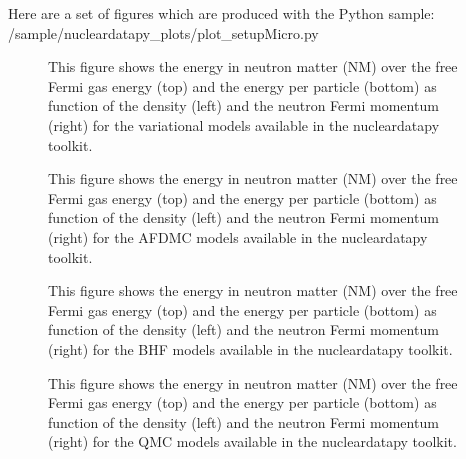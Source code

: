 \documentclass[letterpaper,10pt,english]{sphinxmanual}
\begin{document}
\sphinxAtStartPar
Here are a set of figures which are produced with the Python sample: /sample/nucleardatapy\_plots/plot\_setupMicro.py

\begin{figure}[htbp]
\centering
\capstart

\noindent{}
\caption{This figure shows the energy in neutron matter (NM) over the free Fermi gas energy (top) and the energy per particle (bottom) as function of the density (left) and the neutron Fermi momentum (right) for the variational models available in the nucleardatapy toolkit.}\label{\detokenize{source/api/setup_micro_matter:id1}}\end{figure}

\begin{figure}[htbp]
\centering
\capstart

\noindent{}
\caption{This figure shows the energy in neutron matter (NM) over the free Fermi gas energy (top) and the energy per particle (bottom) as function of the density (left) and the neutron Fermi momentum (right) for the AFDMC models available in the nucleardatapy toolkit.}\label{\detokenize{source/api/setup_micro_matter:id2}}\end{figure}

\begin{figure}[htbp]
\centering
\capstart

\noindent{}
\caption{This figure shows the energy in neutron matter (NM) over the free Fermi gas energy (top) and the energy per particle (bottom) as function of the density (left) and the neutron Fermi momentum (right) for the BHF models available in the nucleardatapy toolkit.}\label{\detokenize{source/api/setup_micro_matter:id3}}\end{figure}

\begin{figure}[htbp]
\centering
\capstart

\noindent{}
\caption{This figure shows the energy in neutron matter (NM) over the free Fermi gas energy (top) and the energy per particle (bottom) as function of the density (left) and the neutron Fermi momentum (right) for the QMC models available in the nucleardatapy toolkit.}\label{\detokenize{source/api/setup_micro_matter:id4}}\end{figure}
\end{document}
